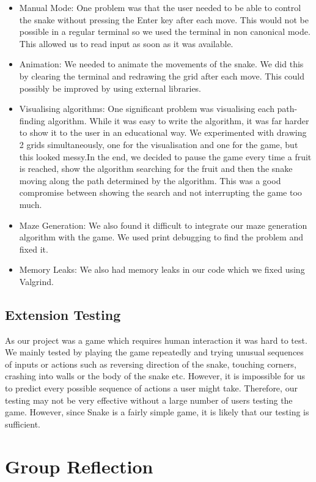 \documentclass[11pt]{article}
\begin{document}
\begin{itemize}
    \item Manual Mode: One problem was that the user needed to be able to control the snake without pressing the Enter key after each move. This would not be possible in a regular terminal 
    so we used the terminal in non canonical mode. This allowed us to read input as soon as it was available.
    \item Animation: We needed to animate the movements of the snake. We did this by clearing the terminal and redrawing the grid after each move. This could possibly be improved by using external libraries.
    \item Visualising algorithms: One significant problem was visualising each path-finding algorithm. While it was easy to write the algorithm, it was far harder to show it to the user in an educational way. 
    We experimented with drawing 2 grids simultaneously, one for the visualisation and one for the game, but this looked messy.In the end, we decided to pause the game every time a fruit is reached, show the algorithm 
    searching for the fruit and then the snake moving along the path determined by the algorithm. This was a good compromise between showing the search and not interrupting the game too much.
    \item Maze Generation: We also found it difficult to integrate our maze generation algorithm with the game. We used print debugging to find the problem and fixed it.
    \item Memory Leaks: We also had memory leaks in our code which we fixed using Valgrind.
\end{itemize}

\subsection{Extension Testing}
As our project was a game which requires human interaction it was hard to test. We mainly tested by playing the game repeatedly and trying unusual sequences of inputs or actions such as reversing direction of the snake, 
touching corners, crashing into walls or the body of the snake etc. However, it is impossible for us to predict every possible sequence of actions a user might take. Therefore, our testing may not be very effective without 
a large number of users testing the game. However, since Snake is a fairly simple game, it is likely that our testing is sufficient.

\section{Group Reflection}
\end{document}
